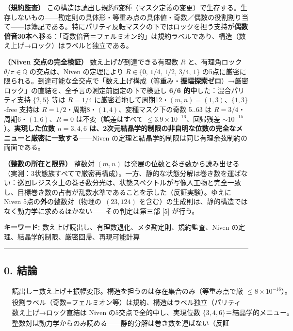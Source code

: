 \documentclass[
  a4paper,
]{ltjsarticle}
\begin{document}
\textbf{（規約監査）}
この構造は読出し規約5変種（マスク定義の変更）で生存する。生存しないもの------勘定則の具体形・等重み点の具体値・奇数／偶数の役割割り当て------は簿記である。特にパリティ反転マスクの下ではロックを担う支持が\textbf{偶数倍音30本}へ移る：「奇数倍音＝フェルミオン的」は規約ラベルであり、構造（数え上げ→ロック）はラベルと独立である。

\textbf{（Niven 交点の完全検証）} 数え上げが到達できる有理数 \(R\)
と、有理角ロック \(\theta/\pi\in\mathbb{Q}\) の交点は、Niven
の定理により \(R\in\{0,\,1/4,\,1/2,\,3/4,\,1\}\)
の5点に厳密に限られる。到達可能な全交点で「数え上げ構成（等重み・\textbf{振幅探索ゼロ}）→厳密ロック」の直結を、全予言の測定前固定の下で検証し
\textbf{6/6 的中}した：混合パリティ支持 \(\{2,5\}\) 等は \(R=1/4\)
に厳密着地して周期12・\((m,n)=(1,3)\)、\(\{1,3\}\)-free 支持は
\(R=1/2\)・周期8・\((1,4)\)、変種マスク下の奇数 5..63 は
\(R=3/4\)・周期6・\((1,6)\)、\(R=0\) は不変（誤差はすべて
\(\le3.9\times10^{-16}\)、回帰残差
\(\sim10^{-15}\)）。\textbf{実現した位数 \(n=3,4,6\)
は、2次元結晶学的制限の非自明な位数の完全なメニューと厳密に一致する}------Niven
の定理と結晶学的制限は同じ有理余弦制約の両面である。

\textbf{（整数の所在と限界）} 整数対 \((m,n)\)
は発展の位数と巻き数から読み出せる（実測：3状態族すべてで厳密再構成）。一方、静的な状態分解は巻き数を運ばない：巡回レジスタ上の巻き数分光は、状態スペクトルが写像人工物と完全一致し、目標巻き数の占有が乱数水準であることを示した（反証実験）。ゆえに
Niven 5点の\textbf{外}の整数対（物理の \(\,(23,124)\)
を含む）の生成則は、静的構造ではなく動力学に求めるほかない------その判定は第三部
{[}5{]} が行う。

\textbf{キーワード:}
数え上げ読出し、有理数退化、メタ勘定則、規約監査、Niven
の定理、結晶学的制限、厳密回帰、再現可能計算

\begin{center}\rule{0.5\linewidth}{0.5pt}\end{center}

\subsection{0. 結論}\label{ux7d50ux8ad6}

\[
\boxed{
\begin{aligned}
&\text{読出し＝数え上げ＋振幅変形。構造を担うのは存在集合のみ（等重み点で厳密有理数、20/20 で }\le8\times10^{-16}\text{）。}\\
&\text{役割ラベル（奇数=フェルミオン等）は規約、構造はラベル独立（パリティ反転で偶数側がロック）。}\\
&\text{数え上げ→ロック直結は Niven の5交点で全的中し、実現位数 }\{3,4,6\}\text{＝結晶学的メニュー。}\\
&\text{整数対は動力学からのみ読める——静的分解は巻き数を運ばない（反証済）。}
\end{aligned}
}
\]
\end{document}
